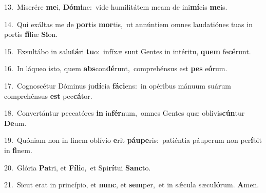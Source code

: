 {\numbfont\textcolor{\numbcolor}{13.}}~Miserére \textbf{me}\-i, \textbf{Dó}\-\textbf{mi}ne:~\star vide humilitátem meam de ini\-\textbf{mí}\-cis \textbf{me}\-is.\par
{\numbfont\textcolor{\numbcolor}{14.}}~Qui exáltas me de \textbf{por}\-tis \textbf{mor}\-tis,~\star ut annúntiem omnes laudatiónes tuas in portis \textbf{fí}\-liæ \textbf{Si}\-on.\par
{\numbfont\textcolor{\numbcolor}{15.}}~Exsultábo in salu\-\textbf{tá}\-ri \textbf{tu}\-o:~\star infíxæ sunt Gentes in intéritu, \textbf{quem} fe\-\textbf{cé}\-runt.\par
{\numbfont\textcolor{\numbcolor}{16.}}~In láqueo isto, quem \textbf{abs}\-con\-\textbf{dé}\-runt,~\star comprehénsus est \textbf{pes} e\-\textbf{ó}\-rum.\par
{\numbfont\textcolor{\numbcolor}{17.}}~Cognoscétur Dóminus ju\-\textbf{dí}\-cia \textbf{fá}\-\textbf{ci}ens:~\star in opéribus mánuum suárum comprehénsus \textbf{est} pec\-\textbf{cá}\-tor.\par
{\numbfont\textcolor{\numbcolor}{18.}}~Convertántur peccatóres \textbf{in} in\-\textbf{fér}\-num,~\star omnes Gentes quæ oblivis\-\textbf{cún}\-tur \textbf{De}\-um.\par
{\numbfont\textcolor{\numbcolor}{19.}}~Quóniam non in finem oblívio \textbf{e}\-rit \textbf{páu}\-\textbf{pe}ris:~\star patiéntia páuperum non per\-\textbf{í}\-bit in \textbf{fi}\-nem.\par
{\numbfont\textcolor{\numbcolor}{20.}}~Glória \textbf{Pa}\-tri, et \textbf{Fí}\-\textbf{li}o,~\star et Spi\-\textbf{rí}\-tui \textbf{Sanc}\-to.\par
{\numbfont\textcolor{\numbcolor}{21.}}~Sicut erat in princípio, et \textbf{nunc}\-, et \textbf{sem}\-per,~\star et in sǽcula sæcu\-\textbf{ló}\-rum. \textbf{A}\-men.\par
